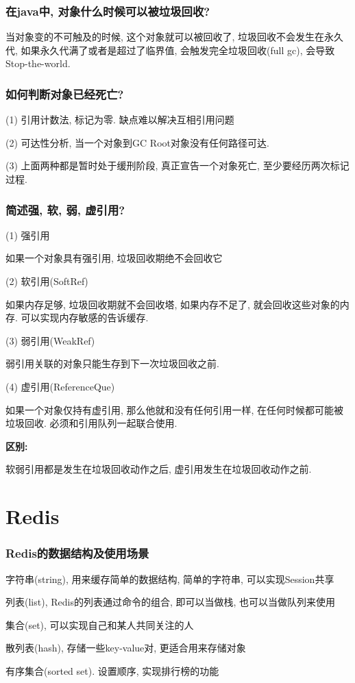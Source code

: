 \documentclass[UTF8]{ctexart}
\begin{document}
\subsubsection{在java中, 对象什么时候可以被垃圾回收?}
当对象变的不可触及的时候, 这个对象就可以被回收了, 垃圾回收不会发生在永久代, 如果永久代满了或者是超过了临界值, 会触发完全垃圾回收(full gc), 会导致Stop-the-world. 
\subsubsection{如何判断对象已经死亡?}
(1) 引用计数法, 标记为零. 缺点难以解决互相引用问题 \par
(2) 可达性分析, 当一个对象到GC Root对象没有任何路径可达. \par
(3) 上面两种都是暂时处于缓刑阶段, 真正宣告一个对象死亡, 至少要经历两次标记过程.
\subsubsection{简述强, 软, 弱, 虚引用?}
(1) 强引用 \par
如果一个对象具有强引用, 垃圾回收期绝不会回收它 \par
(2) 软引用(SoftRef) \par
如果内存足够, 垃圾回收期就不会回收塔, 如果内存不足了, 就会回收这些对象的内存. 可以实现内存敏感的告诉缓存. \par
(3) 弱引用(WeakRef) \par
弱引用关联的对象只能生存到下一次垃圾回收之前. \par
(4) 虚引用(ReferenceQue) \par
如果一个对象仅持有虚引用, 那么他就和没有任何引用一样, 在任何时候都可能被垃圾回收. 必须和引用队列一起联合使用.\par
\textbf{区别:} \par
软弱引用都是发生在垃圾回收动作之后, 虚引用发生在垃圾回收动作之前.



\section{Redis}
\subsubsection{Redis的数据结构及使用场景}
字符串(string), 用来缓存简单的数据结构, 简单的字符串, 可以实现Session共享\par
列表(list), Redis的列表通过命令的组合, 即可以当做栈, 也可以当做队列来使用\par
集合(set), 可以实现自己和某人共同关注的人\par
散列表(hash), 存储一些key-value对, 更适合用来存储对象\par
有序集合(sorted set). 设置顺序, 实现排行榜的功能\par
\end{document}
